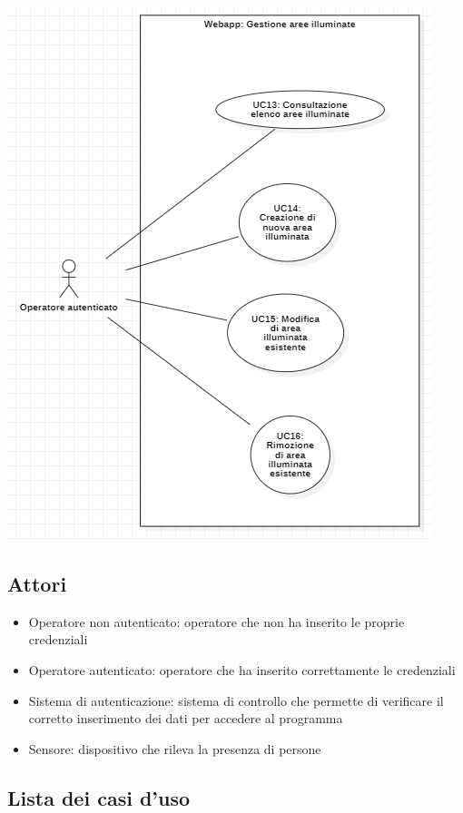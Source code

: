 \documentclass[a4paper, 12pt]{article}
\begin{document}
\includegraphics[scale=0.7]{diagramma_use_case_4.png}

\subsection{Attori}
\begin{itemize}
    \item Operatore non autenticato: operatore che non ha inserito le proprie credenziali
    \item Operatore autenticato: operatore che ha inserito correttamente le credenziali
    \item Sistema di autenticazione: sistema di controllo che permette di verificare il corretto inserimento dei dati per accedere al programma
    \item Sensore: dispositivo che rileva la presenza di persone
\end{itemize}

\subsection{Lista dei casi d'uso}
\end{document}
